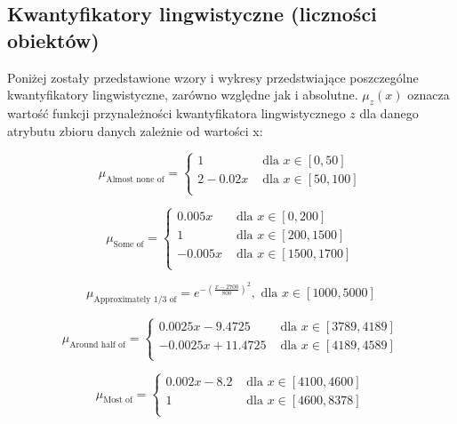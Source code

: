 \documentclass{classrep}
\begin{document}
\subsection{Kwantyfikatory lingwistyczne (liczności obiektów)}

Poniżej zostały przedstawione wzory i wykresy przedstwiające poszczególne kwantyfikatory lingwistyczne, zarówno względne jak i absolutne. 
\( \mu_z(x) \) oznacza wartość funkcji przynależności kwantyfikatora lingwistycznego \(z\) dla danego atrybutu zbioru danych zależnie od wartości x:

 \begin{equation}
    \mu_{\text{Almost none of}} = 
    \begin{cases}
        1 & \text{ dla } x \in [0,50] \\
        2 - 0.02x & \text{ dla } x \in [50,100] \\
      \end{cases}
  \end{equation}

  \begin{equation}
    \mu_{\text{Some of}} =
      \begin{cases}
        0.005x & \text{ dla } x \in [0,200] \\
        1 & \text{ dla } x \in [200,1500] \\
        -0.005x & \text{ dla } x \in [1500,1700] \\
      \end{cases}  
  \end{equation}
  
  \begin{equation}
    \mu_{\text{Approximately 1/3 of}} = e^{-(\frac{x-2700}{800})^2}, \text{ dla } x \in [1000,5000]
  \end{equation}

   \begin{equation}
    \mu_{\text{Around half of}} =
      \begin{cases}
        0.0025x - 9.4725 & \text{ dla } x \in [3789,4189] \\
        -0.0025x + 11.4725 & \text{ dla } x \in [4189,4589] \\
      \end{cases}  
  \end{equation}
  
  \begin{equation}
    \mu_{\text{Most of}} =
      \begin{cases}
        0.002x - 8.2 & \text{ dla } x \in [4100,4600] \\
        1 & \text{ dla } x \in [4600,8378] \\
      \end{cases}  
  \end{equation}
  
\end{document}
